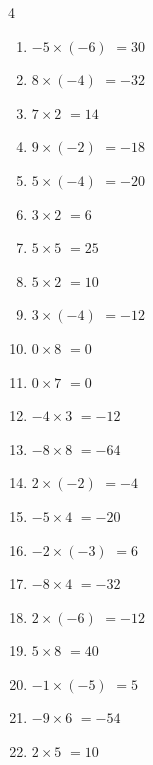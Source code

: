 \begin{multicols}{4}
\begin{enumerate}
\columnbreak %

\resetques

  \item $-5\times (-6)$
        $=30$

  \item $8\times (-4)$
        $=-32$

  \item $7\times 2$
        $=14$

  \item $9\times (-2)$
        $=-18$

  \item $5\times (-4)$
        $=-20$

  \item $3\times 2$
        $=6$

  \item $5\times 5$
        $=25$

  \item $5\times 2$
        $=10$

  \item $3\times (-4)$
        $=-12$

  \item $0\times 8$
        $=0$

  \item $0\times 7$
        $=0$

  \item $-4\times 3$
        $=-12$

  \item $-8\times 8$
        $=-64$

  \item $2\times (-2)$
        $=-4$

  \item $-5\times 4$
        $=-20$

  \item $-2\times (-3)$
        $=6$

  \item $-8\times 4$
        $=-32$

  \item $2\times (-6)$
        $=-12$

  \item $5\times 8$
        $=40$

  \item $-1\times (-5)$
        $=5$

  \item $-9\times 6$
        $=-54$

  \item $2\times 5$
        $=10$


\end{enumerate}
\end{multicols}
